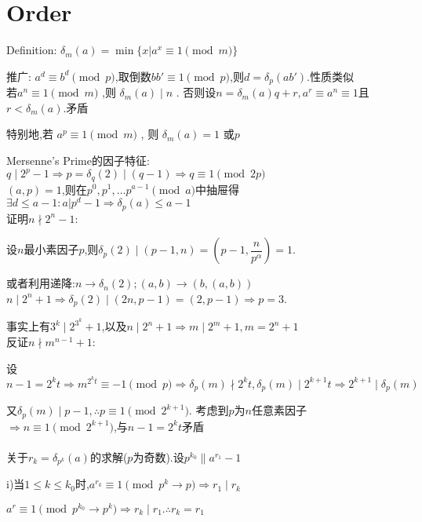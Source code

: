 
\section{Order}
Definition: $  \delta_m(a)=\min \{x|a^x \equiv 1 \pmod m\} $ 

推广: $ a^d\equiv b^d \pmod p$,取倒数$ bb'\equiv1\pmod p$,则$ d=\delta_p(ab')$.性质类似
\\
若$ a^n \equiv 1 \pmod m$ ,则 $ \delta_m(a)\mid n $ .
否则设$ n=\delta_m(a)q+r,a^r \equiv a^n \equiv 1 $且$ r<\delta_m(a)$.矛盾

特别地,若 $ a^p\equiv 1 \pmod m$ , 则 $ \delta_m(a)=1 $ 或$ p$ 

Mersenne's Prime的因子特征:$ q\mid 2^p-1\Rightarrow p=\delta_q(2)\mid (q-1)\Rightarrow q\equiv 1 \pmod{2p} $ 
\\

$ (a,p)=1$,则在$ p^0,p^1,\ldots p^{a-1} \pmod a$中抽屉得 $ \exists d \le a-1: a|p^d-1\Rightarrow \delta_p(a)\le a-1$
\\

证明$ n \nmid 2^n-1$:

设$ n$最小素因子$ p$,则$ \delta_p(2) \mid (p-1,n)=(p-1,\dfrac{n}{p^{\alpha}})=1$.

或者利用递降:$ n\rightarrow \delta_n(2) ; (a,b)\rightarrow (b,(a,b))$
\\

$ n\mid 2^n+1\Rightarrow \delta_p(2)\mid (2n,p-1)=(2,p-1)\Rightarrow p=3$.

事实上有$ 3^k \mid 2^{3^k}+1$,以及$ n\mid 2^n+1 \Rightarrow m\mid 2^m+1,m=2^n+1$
\\

反证$ n \nmid m^{n-1}+1$:

设$ n-1=2^kt\Rightarrow m^{2^kt}\equiv -1 \pmod p\Rightarrow \delta_p(m)\nmid 2^kt,\delta_p(m)\mid 2^{k+1}t\Rightarrow 2^{k+1}\mid\delta_p(m)$

又$ \delta_p(m)\mid p-1,\therefore p \equiv 1 \pmod{2^{k+1}}.$
考虑到$ p$为$ n$任意素因子$ \Rightarrow n\equiv 1 \pmod{2^{k+1}}$,与$ n-1=2^kt$矛盾
\\
\\

关于$ r_k=\delta_{p^k}(a)$的求解($ p$为奇数).设$ p^{k_0}\parallel a^{r_1}-1$

i)当$ 1\le k \le k_0$时,$ a^{r_k}\equiv1 \pmod{p^k \rightarrow p}\Rightarrow r_1\mid r_k$

$ a^r\equiv1 \pmod{p^{k_0}\rightarrow p^k}\Rightarrow r_k\mid r_1. \therefore r_k=r_1$

